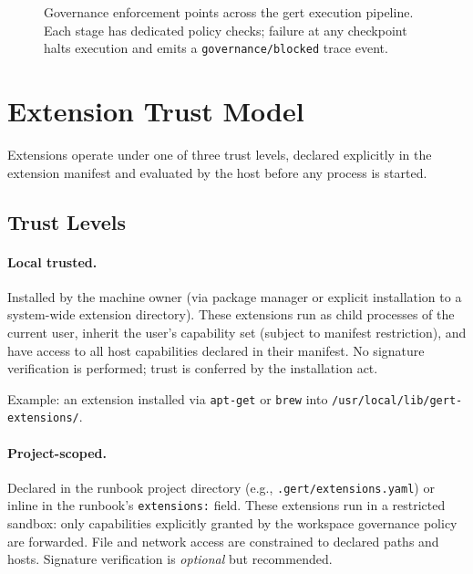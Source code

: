 \begin{figure}[H]
\caption{Governance enforcement points across the gert execution pipeline.
  Each stage has dedicated policy checks; failure at any checkpoint halts
  execution and emits a \texttt{governance/blocked} trace event.}
\label{fig:governance-enforcement-points}
\end{figure}

\section{Extension Trust Model}
\label{sec:extension-trust}

Extensions operate under one of three trust levels, declared explicitly in the
extension manifest and evaluated by the host before any process is started.

\subsection{Trust Levels}

\paragraph{Local trusted.}
Installed by the machine owner (via package manager or explicit installation to
a system-wide extension directory).  These extensions run as child processes of
the current user, inherit the user's capability set (subject to manifest
restriction), and have access to all host capabilities declared in their
manifest.  No signature verification is performed; trust is conferred by the
installation act.

Example: an extension installed via \texttt{apt-get} or \texttt{brew} into
\texttt{/usr/local/lib/gert-extensions/}.

\paragraph{Project-scoped.}
Declared in the runbook project directory (e.g.,
\texttt{.gert/extensions.yaml}) or inline in the runbook's \texttt{extensions:}
field.  These extensions run in a restricted sandbox: only capabilities
explicitly granted by the workspace governance policy are forwarded.  File and
network access are constrained to declared paths and hosts.  Signature
verification is \emph{optional} but recommended.

